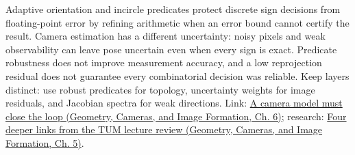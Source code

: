 Adaptive orientation and incircle predicates protect discrete sign decisions from floating-point error by refining arithmetic when an error bound cannot certify the result. Camera estimation has a different uncertainty: noisy pixels and weak observability can leave pose uncertain even when every sign is exact. Predicate robustness does not improve measurement accuracy, and a low reprojection residual does not guarantee every combinatorial decision was reliable. Keep layers distinct: use robust predicates for topology, uncertainty weights for image residuals, and Jacobian spectra for weak directions. Link: \href{../03-Geometry-Cameras-and-Image-Formation/main.pdf\#nameddest=02-foundations-ii-ch037-a-camera-model-must-close-the-loop}{A camera model must close the loop (Geometry, Cameras, and Image Formation, Ch. 6)}; research: \href{../03-Geometry-Cameras-and-Image-Formation/main.pdf\#nameddest=02-foundations-ii-ch036-four-deeper-links-from-the-tum-lecture-review}{Four deeper links from the TUM lecture review (Geometry, Cameras, and Image Formation, Ch. 5)}.
